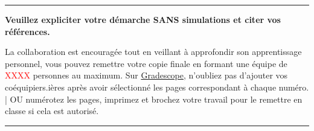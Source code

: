 \documentclass[english,french,12pt]{article} %
\begin{document}
\vfill
\hrule
\vspace{0.3em}
\centering
\textbf{Veuillez expliciter votre démarche SANS simulations et citer vos références.}\par %
\vspace{-0.3em}
La collaboration est encouragée tout en veillant à approfondir son apprentissage personnel, vous pouvez remettre votre copie finale en formant une équipe de \textcolor{red}{XXXX} personnes au maximum. Sur \href{https://www.gradescope.com/}{Gradescope}, n'oubliez pas d'ajouter vos coéquipiers.ières après avoir sélectionné les pages correspondant à chaque numéro. | OU numérotez les pages, imprimez et brochez votre travail pour le remettre en classe si cela est autorisé.\par
\vspace{1em}
\hrule
\end{document}
